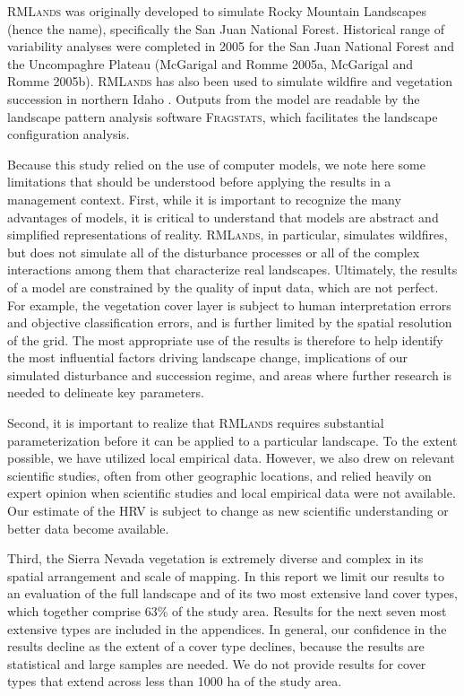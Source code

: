 \textsc{RMLands} was originally developed to simulate Rocky Mountain Landscapes (hence the name), specifically the San Juan National Forest. Historical range of variability analyses were completed in 2005 for the San Juan National Forest and the Uncompaghre Plateau (McGarigal and Romme 2005a, McGarigal and Romme 2005b). \textsc{RMLands} has also been used to simulate wildfire and vegetation succession in northern Idaho \citep{Cushman2011}. Outputs from the model are readable by the landscape pattern analysis software \textsc{Fragstats}, which facilitates the landscape configuration analysis.

Because this study relied on the use of computer models, we note here some limitations that should be understood before applying the results in a management context. First, while it is important to recognize the many advantages of models, it is critical to understand that models are abstract and simplified representations of reality. \textsc{RMLands}, in particular, simulates wildfires, but does not simulate all of the disturbance processes or all of the complex interactions among them that characterize real landscapes. Ultimately, the results of a model are constrained by the quality of input data, which are not perfect. For example, the vegetation cover layer is subject to human interpretation errors and objective classification errors, and is further limited by the spatial resolution of the grid. The most appropriate use of the results is therefore to help identify the most influential factors driving landscape change, implications of our simulated disturbance and succession regime, and areas where further research is needed to delineate key parameters.

Second, it is important to realize that \textsc{RMLands} requires substantial parameterization before it can be applied to a particular landscape. To the extent possible, we have utilized local empirical data. However, we also drew on relevant scientific studies, often from other geographic locations, and relied heavily on expert opinion when scientific studies and local empirical data were not available. Our estimate of the HRV is subject to change as new scientific understanding or better data become available.

Third, the Sierra Nevada vegetation is extremely diverse and complex in its spatial arrangement and scale of mapping. In this report we limit our results to an evaluation of the full landscape and of its two most extensive land cover types, which together comprise 63\% of the study area. Results for the next seven most extensive types are included in the appendices. In general, our confidence in the results decline as the extent of a cover type declines, because the results are statistical and large samples are needed. We do not provide results for cover types that extend across less than 1000 ha of the study area.

